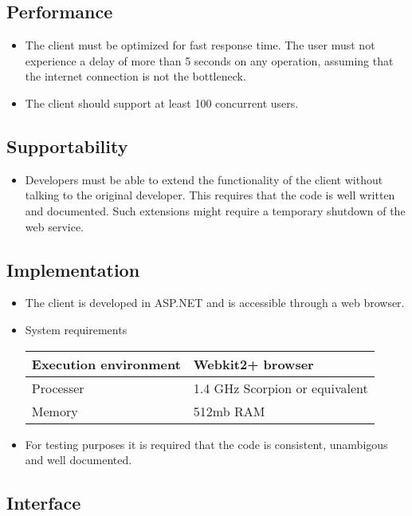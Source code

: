 \documentclass{report}
\begin{document}
\subsection{Performance}

\begin{itemize}
\item The client must be optimized for fast response time. The user must not experience a delay of more than 5 seconds on any operation, assuming that the internet connection is not the bottleneck.

\item The client should support at least 100 concurrent users. 
\end{itemize}
\subsection{Supportability}

\begin{itemize}
\item Developers must be able to extend the functionality of the client without talking to the original developer. This requires that the code is well written and documented. Such extensions might require a temporary shutdown of the web service.
\end{itemize}

\subsection{Implementation}
\begin{itemize}
\item The client is developed in ASP.NET and is accessible through a web browser.
\item System requirements


\begin{tabular}{| l | l | }
\hline
 Execution environment & Webkit2+ browser \\ \hline
 Processer & 1.4 GHz Scorpion or equivalent \\ \hline
 Memory & 512mb RAM  \\ \hline

\end{tabular}

\item For testing purposes it is required that the code is consistent, unambigous and well documented.
\end{itemize}

\subsection{Interface}
\end{document}
